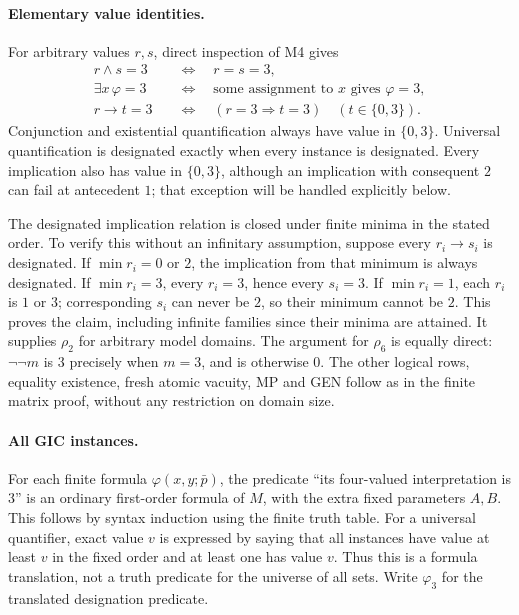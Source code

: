 \paragraph{Elementary value identities.}
For arbitrary values $r,s$, direct inspection of M4 gives
\begin{align*}
 r\land s=3&\quad\Longleftrightarrow\quad r=s=3,\\
 \exists x\,\varphi=3&\quad\Longleftrightarrow\quad
                 \text{some assignment to }x\text{ gives }\varphi=3,\\
 r\to t=3&\quad\Longleftrightarrow\quad
                 (r=3\Longrightarrow t=3)\quad(t\in\{0,3\}).
\end{align*}
Conjunction and existential quantification always have value in
$\{0,3\}$.  Universal quantification is designated exactly when
every instance is designated.  Every implication also has value in
$\{0,3\}$, although an implication with consequent $2$ can fail at
antecedent $1$; that exception will be handled explicitly below.

The designated implication relation is closed under finite minima in
the stated order.  To verify this without an infinitary assumption,
suppose every $r_i\to s_i$ is designated.  If $\min r_i=0$ or $2$,
the implication from that minimum is always designated.  If
$\min r_i=3$, every $r_i=3$, hence every $s_i=3$.  If
$\min r_i=1$, each $r_i$ is $1$ or $3$; corresponding $s_i$ can
never be $2$, so their minimum cannot be $2$.  This proves the
claim, including infinite families since their minima are attained.
It supplies $\rho_2$ for arbitrary model domains.  The argument for
$\rho_6$ is equally direct: $\neg\neg m$ is $3$ precisely when
$m=3$, and is otherwise $0$.  The other logical rows, equality
existence, fresh atomic vacuity, MP and GEN follow as in the finite
matrix proof, without any restriction on domain size.

\paragraph{All GIC instances.}
For each finite formula $\varphi(x,y;\bar p)$, the predicate
``its four-valued interpretation is $3$'' is an ordinary first-order
formula of $M$, with the extra fixed parameters $A,B$.  This follows
by syntax induction using the finite truth table.  For a universal
quantifier, exact value $v$ is expressed by saying that all instances
have value at least $v$ in the fixed order and at least one has value
$v$.  Thus this is a formula translation, not a truth predicate for
the universe of all sets.  Write $\varphi_3$ for the translated
designation predicate.

